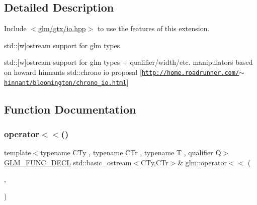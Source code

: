 \subsection{Detailed Description}
Include $<$\hyperlink{io_8hpp}{glm/gtx/io.\+hpp}$>$ to use the features of this extension.

std\+:\+:\mbox{[}w\mbox{]}ostream support for glm types

std\+:\+:\mbox{[}w\mbox{]}ostream support for glm types + qualifier/width/etc. manipulators based on howard hinnant\textquotesingle{}s std\+::chrono io proposal \mbox{[}\href{http://home.roadrunner.com/~hinnant/bloomington/chrono_io.html}{\tt http\+://home.\+roadrunner.\+com/$\sim$hinnant/bloomington/chrono\+\_\+io.\+html}\mbox{]} 

\subsection{Function Documentation}
\mbox{\label{group__gtx__io_ga0d49970be1b7cdc10a2b027cea97c7e3}} 
\subsubsection{\texorpdfstring{operator$<$$<$()}{operator<<()}\hspace{0.1cm}{\footnotesize\ttfamily [1/15]}}
{\footnotesize\ttfamily template$<$typename C\+Ty , typename C\+Tr , typename T , qualifier Q$>$ \\
\hyperlink{setup_8hpp_ab2d052de21a70539923e9bcbf6e83a51}{G\+L\+M\+\_\+\+F\+U\+N\+C\+\_\+\+D\+E\+CL} std\+::basic\+\_\+ostream$<$C\+Ty,C\+Tr$>$\& glm\+::operator$<$$<$ (\begin{DoxyParamCaption}\item[{std\+::basic\+\_\+ostream$<$ C\+Ty, C\+Tr $>$ \&}]{,  }\item[{\hyperlink{structglm_1_1tquat}{tquat}$<$ T, Q $>$ const \&}]{ }\end{DoxyParamCaption})}

\mbox{\label{group__gtx__io_ga7a029530f08d465cd95b60186c625aba}} 
